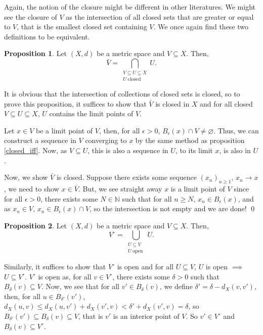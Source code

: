 \documentclass[
]{article}
\theoremstyle{definition}
\newtheorem{prop}{Proposition}
\theoremstyle{definition}
\begin{document}
Again, the notion of the closure might be different in other
literatures. We might see the closure of \(V\) as the intersection of
all closed sets that are greater or equal to \(V\), that is the smallest
closed set containing \(V\). We once again find these two definitions to
be equivalent.

\begin{prop}
  Let \((X, d)\) be a metric space and \(V \subseteq X\). Then, 
  \[\bar{V} = \bigcap_{\substack{V \subseteq U \subseteq X \\ 
    U \mathop{\mathrm{closed}}}} U.\]
\end{prop}
\proof

It is obvious that the intersection of collections of closed sets is
closed, so to prove this proposition, it suffices to show that
\(\bar{V}\) is closed in \(X\) and for all closed
\(V \subseteq U \subseteq X\), \(U\) contains the limit points of \(V\).

Let \(x \in V\) be a limit point of \(V\), then, for all
\(\epsilon > 0\), \(B_\epsilon(x) \cap V \neq \varnothing\). Thus, we
can construct a sequence in \(V\) converging to \(x\) by the same method
as proposition \ref{closed_iff}. Now, as \(V \subseteq U\), this is also
a sequence in \(U\), to its limit \(x\), is also in \(U\).

Now, we show \(\bar{V}\) is closed. Suppose there exists some sequence
\((x_n)_{n \ge 1}\), \(x_n \to x\), we need to show \(x \in \bar{V}\).
But, we see straight away \(x\) is a limit point of \(V\) since for all
\(\epsilon > 0\), there exists some \(N \in \mathbb{N}\) such that for
all \(n \ge N\), \(x_n \in B_\epsilon(x)\), and as \(x_n \in V\),
\(x_n \in B_\epsilon(x) \cap V\), so the intersection is not empty and
we are done! \qed

\begin{prop}
  Let \((X, d)\) be a metric space and \(V \subseteq X\). Then, 
  \[V^\circ = \bigcup_{\substack{U \subseteq V \\ U \mathop{\mathrm{open}}}} U.\]
\end{prop}
\proof

Similarly, it suffices to show that \(V^\circ\) is open and for all
\(U \subseteq V\), \(U\) is open \(\implies\) \(U \subseteq V^\circ\).
\(V^\circ\) is open as, for all \(v \in V^\circ\), there exists some
\(\delta > 0\) such that \(B_\delta(v) \subseteq V\). Now, we see that
for all \(v' \in B_\delta(v)\), we define
\(\delta ' = \delta - d_X(v, v')\), then, for all
\(u \in B_{\delta '}(v')\),
\(d_X(u, v) \le d_X(u, v') + d_X(v', v)  < \delta ' + d_X(v', v) = \delta\),
so \(B_{\delta '}(v') \subseteq B_\delta(v)  \subseteq V\), that is
\(v'\) is an interior point of \(V\). So \(v' \in V^\circ\) and
\(B_\delta(v) \subseteq V^\circ\).
\end{document}
